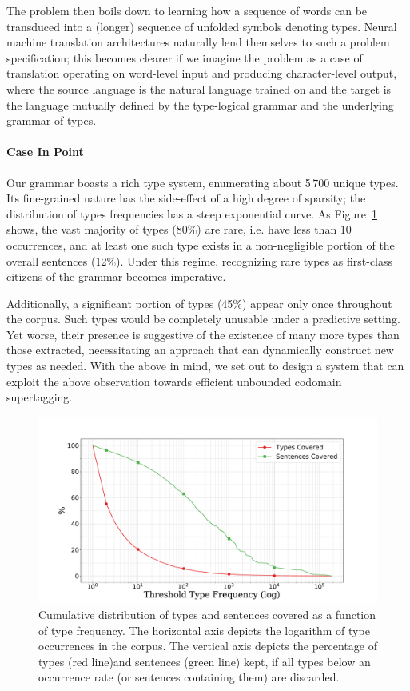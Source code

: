 The problem then boils down to learning how a sequence of words can be transduced into a (longer) sequence of unfolded symbols denoting types.
Neural machine translation architectures naturally lend themselves to such a problem specification; this becomes clearer if we imagine the problem as a case of translation operating on word-level input and producing character-level output, where the source language is the natural language trained on and the target is the language mutually defined by the type-logical grammar and the underlying grammar of types.

\paragraph{Case In Point}
Our grammar boasts a rich type system, enumerating about 5\,700 unique types.
Its fine-grained nature has the side-effect of a high degree of sparsity; the distribution of types frequencies has a steep exponential curve.
As Figure~\ref{fig:type_sparsity} shows, the vast majority of types (80\%) are rare, i.e. have less than 10 occurrences, and at least one such type exists in a non-negligible portion of the overall sentences (12\%).
Under this regime, recognizing rare types as first-class citizens of the grammar becomes imperative.

Additionally, a significant portion of types (45\%) appear only once throughout the corpus.
Such types would be completely unusable under a predictive setting.
Yet worse, their presence is suggestive of the existence of many more types than those extracted, necessitating an approach that can dynamically construct new types as needed.
With the above in mind, we set out to design a system that can exploit the above observation towards efficient unbounded codomain supertagging.

\begin{figure}[t]
    \centering
    \includegraphics[scale=0.29]{Figures/sparsity.pdf}
    \caption[Extracted Type Sparsity]{Cumulative distribution of types and sentences covered as a function of type frequency. The horizontal axis depicts the logarithm of type occurrences in the corpus. The vertical axis depicts the percentage of types (red line)and sentences (green line) kept, if all types below an occurrence rate (or sentences containing them) are discarded.}
    \label{fig:type_sparsity}
\end{figure}

